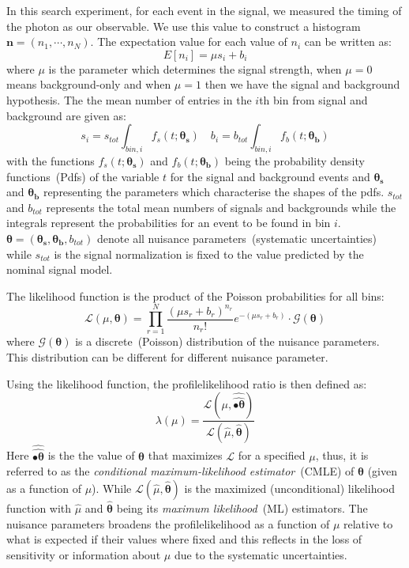In this search experiment, for each event in the signal, we measured the timing of the photon as our observable. We use this value to construct a histogram $\mathbf{n} = \left( n_{1}, \cdots, n_{N}\right)$. The expectation value for each value of $n_{i}$ can be written as:
\begin{equation}
 E[n_{i}] = \mu s_{i} + b_{i}
\end{equation}
where $\mu$ is the parameter which determines the signal strength, when $\mu = 0$ means background-only and when $\mu=1$ then we have the signal and background hypothesis. The the mean number of entries in the $i$th bin from signal and background are given as:
\begin{equation}
s_{i} = s_{tot} \int_{bin, i} f_{s}\left(t;\mathbf{\theta_{s}}\right) \quad 
b_{i} = b_{tot} \int_{bin, i} f_{b}\left(t;\mathbf{\theta_{b}}\right)
\end{equation}
with the functions $f_{s}\left(t;\mathbf{\theta_{s}}\right) $ and $f_{b}\left(t;\mathbf{\theta_{b}}\right) $ being the probability density functions~(Pdfs) of the variable $t$ for the signal and background events and $\mathbf{\theta_{s}} $ and $\mathbf{\theta_{b}} $ representing the parameters which characterise the shapes of the pdfs. $s_{tot}$ and $b_{tot}$ represents the total mean numbers of signals and backgrounds while the integrals represent the probabilities for an event to be found in bin $i$. $\mathbf{\theta} = \left( \mathbf{\theta_{s}}, \mathbf{\theta_{b}}, b_{tot} \right)$ denote all nuisance parameters~(systematic uncertainties) while $s_{tot}$ is the signal normalization is fixed to the value predicted by the nominal signal model.

The likelihood function is the product of the Poisson probabilities for all bins:
\begin{equation}\label{eq:LL}
\mathcal{L}\left( \mu, \mathbf{\theta} \right) = \prod^{N}_{r=1} \frac{{\left( \mu s_{r} + b_{r} \right)}^{n_{r}}}{n_{r}!} e^{-(\mu s_{r} + b_{r})} \cdot \mathcal{G}(\mathbf{\theta} )
\end{equation}
where $\mathcal{G}(\mathbf{\theta} )$ is a discrete~(Poisson) distribution of the nuisance parameters. This distribution can be different for different nuisance parameter.

Using the likelihood function, the profilelikelihood ratio is then defined as:
\begin{equation}\label{eq:PLL}
\lambda(\mu) =  \frac{\mathcal{L}(\mu, \hat{\hat{\mathbf{•\theta}}})}{\mathcal{L}(\hat{\mu}, \hat{\mathbf{\theta}} )}
\end{equation}
Here $\hat{\hat{\mathbf{•\theta}}} $ is the the value of $\mathbf{\theta}$ that maximizes $\mathcal{L}$ for a specified $\mu$, thus, it is referred to as the \textit{conditional maximum-likelihood estimator}~(CMLE) of $\mathbf{\theta}$ (given as a function of $\mu$). While $\mathcal{L}(\hat{\mu}, \hat{\mathbf{\theta}} )$ is the maximized (unconditional) likelihood function with $\hat{\mu}$ and $\hat{\mathbf{\theta}}$ being its \textit{maximum likelihood}~(ML) estimators.
The nuisance parameters broadens the profilelikelihood as a function of $\mu$ relative to what is expected if their values where fixed and this reflects in the loss of sensitivity or information about $\mu$ due to the systematic uncertainties.
